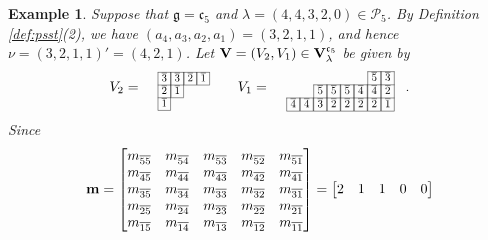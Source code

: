 \documentclass[leqno,11pt]{amsart}
\newtheorem{ex}[thm]{\bf Example}
\numberwithin{equation}{section}
\newcommand{\cP}{\mathscr{P}}
\newcommand{\ov}{\overline}
\newcommand{\g}{\mathfrak{g}}
\newcommand{\mf}{\mathfrak}
\newcommand{\la}{\lambda}
\begin{document}
\begin{ex}\label{ex:embedding-2}
{\rm
Suppose that $\g=\mf c_5$ and $\la=(4,4,3,2,0)\in \cP_5$. By Definition \ref{def:psst}(2), we have $(a_4,a_3,a_2,a_1) =(3,2,1,1)$, and hence $\nu=(3,2,1,1)'=(4,2,1)$.
Let ${\bf V}=(V_2,V_1)\in {\bf V}_\la^{\mf c_5}$ be given by
$$
V_2=\
\resizebox{.13\hsize}{!}
{\def\lr#1{\multicolumn{1}{|@{\hspace{.75ex}}c@{\hspace{.75ex}}|}{\raisebox{-.04ex}{$#1$}}}\raisebox{-.6ex}
{$\begin{array}{ccccccccccccccccccc}
\cline{2-9}
& \lr{\ov{3}} & \lr{\ov{3}} & \lr{\ov 2} & \lr{\ov{1}}   \\
\cline{2-5}
& \lr{\ov{2}} &  \lr{\ov{1}} \\
\cline{2-3}
& \lr{\ov{1}} \\
\cline{2-2}
\end{array}$}}
\quad\quad
V_1=\
\resizebox{.27\hsize}{!}
{\def\lr#1{\multicolumn{1}{|@{\hspace{.75ex}}c@{\hspace{.75ex}}|}{\raisebox{-.04ex}{$#1$}}}\raisebox{-.6ex}
{$\begin{array}{ccccccccccccccccccc}
\cline{8-9}
& & & & & & & \lr{\ov{5}} & \lr{\ov{3}} &  \\
\cline{4-9}
& & & \lr{\ov{5}}  & \lr{\ov{5}}   & \lr{\ov{5}} & \lr{\ov{4}}  & \lr{\ov{4}}  & \lr{\ov{2}}\\
\cline{2-9}
& \lr{\ov{4}} & \lr{\ov{4}}  & \lr{\ov{3}} & \lr{\ov{2}} & \lr{\ov{2}} & \lr{\ov{2}} & \lr{\ov{2}} &  \lr{\ov{1}}\\
\cline{2-9}
\end{array}$}}.
$$ \vskip 2mm 
Since 
\begin{equation*}
{\bf m}
=
\begin{bmatrix}
m_{\ov 5 \ov 5} & m_{\ov 5\ov 4} & m_{\ov 5\ov 3} & m_{\ov 5 \ov 2} & m_{\ov 5\ov 1} \\
m_{\ov 4 \ov 5} & m_{\ov 4\ov 4} & m_{\ov 4\ov 3} & m_{\ov 4\ov 2} & m_{\ov 4\ov 1} \\
m_{\ov 3\ov 5} & m_{\ov 3\ov 4} & m_{\ov 3\ov 3} & m_{\ov 3\ov 2} & m_{\ov 3\ov 1} \\
m_{\ov 2\ov 5} & m_{\ov 2\ov 4} & m_{\ov 2\ov 3} & m_{\ov 2\ov 2} & m_{\ov 2\ov 1} \\
m_{\ov 1\ov 5} & m_{\ov 1\ov 4} & m_{\ov 1\ov 3} & m_{\ov 1\ov 2} & m_{\ov 1\ov 1}
\end{bmatrix}
=
\begin{bmatrix}
2 & 1 & 1 & 0 & 0 \\

\end{bmatrix}
\end{equation*}}
\end{ex}
\end{document}
